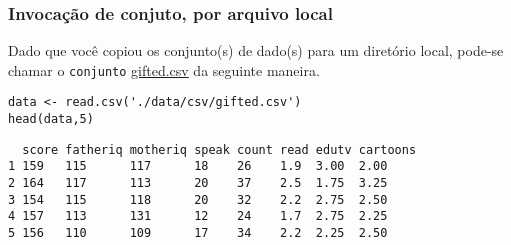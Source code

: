 \documentclass[11pt]{article}
\begin{document}
\subsubsection{Invocação de conjuto, por arquivo local}
\label{sec:org918ea8d}

Dado que você copiou os conjunto(s) de dado(s) para um diretório
local, pode-se chamar o \texttt{conjunto} \href{https://drive.google.com/file/d/1stukrpc\_Rqu-nlYZu\_-BFHNZec676\_BR/view?usp=sharing}{gifted.csv} da seguinte maneira.

\begin{verbatim}
data <- read.csv('./data/csv/gifted.csv')
head(data,5)
\end{verbatim}

\begin{verbatim}
  score fatheriq motheriq speak count read edutv cartoons
1 159   115      117      18    26    1.9  3.00  2.00    
2 164   117      113      20    37    2.5  1.75  3.25    
3 154   115      118      20    32    2.2  2.75  2.50    
4 157   113      131      12    24    1.7  2.75  2.25    
5 156   110      109      17    34    2.2  2.25  2.50    
\end{verbatim}
\end{document}
